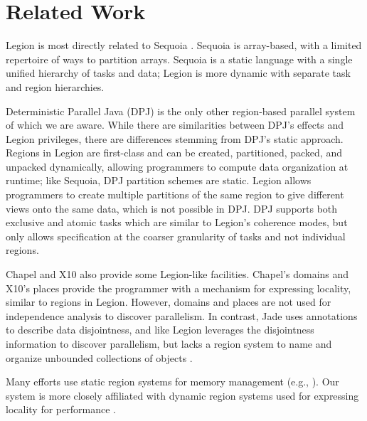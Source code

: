 
\section{Related Work}
\label{sec:related}
Legion is most directly related to Sequoia \cite{Fatahalian06}.  Sequoia is array-based, with
a limited repertoire of ways to partition arrays.  Sequoia is a static language with a single unified hierarchy
of tasks and data; Legion is more dynamic with separate task and region hierarchies.

Deterministic Parallel Java (DPJ) is the only other region-based parallel system of which we are
aware\cite{Bocchino09}.  While there are similarities between DPJ's effects and Legion privileges, 
there are differences stemming from DPJ's static approach.
Regions in Legion are first-class and can be created, partitioned, packed, and unpacked 
dynamically, allowing programmers to compute data organization at runtime; like Sequoia, DPJ
partition schemes are static.  Legion allows 
programmers to create multiple partitions of the same region to give different 
views onto the same data, which is not possible in DPJ.  DPJ supports both
exclusive and atomic tasks which are similar to Legion's coherence modes, but only
allows specification at the coarser granularity of tasks and not individual regions.

Chapel \cite{Chamberlain:Chapel} and X10 \cite{X1005} also provide some Legion-like facilities.
Chapel's domains and X10's places provide the programmer with a 
mechanism for expressing locality, similar to regions in Legion.  However, domains
and places are not used for independence analysis to discover parallelism.
In contrast, Jade uses annotations to describe
data disjointness,  and like Legion leverages the disjointness information
to discover parallelism, but lacks a region system to name and organize unbounded collections of objects \cite{Rinard98}.  

Many efforts use static region systems for  memory management (e.g., \cite{Tofte94, Grossman02}).
Our system is more closely affiliated with dynamic region systems used for expressing locality for performance \cite{Gay01}.

